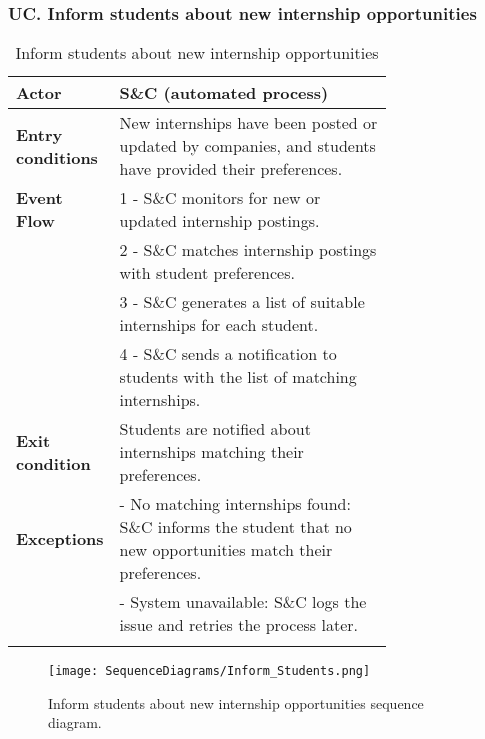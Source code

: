 \subsubsection*{UC\cuc . Inform students about new internship opportunities}
\begin{center}
    \begin{longtable}{|l|p{0.75\linewidth}|}
        \hline
        \textbf{Actor}            & S\&C (automated process) \\
        \hline
        \textbf{Entry conditions} & New internships have been posted or updated by companies, and students have provided their preferences. \\
        \hline
        \textbf{Event Flow}       & 1 - S\&C monitors for new or updated internship postings. \\
        & 2 - S\&C matches internship postings with student preferences. \\
        & 3 - S\&C generates a list of suitable internships for each student. \\
        & 4 - S\&C sends a notification to students with the list of matching internships. \\
        \hline
        \textbf{Exit condition}   & Students are notified about internships matching their preferences. \\       
        \hline
        \textbf{Exceptions}       & - No matching internships found: S\&C informs the student that no new opportunities match their preferences. \\
                                  & - System unavailable: S\&C logs the issue and retries the process later. \\
        \hline
        \caption{Inform students about new internship opportunities}
        \label{tab:inform_students_usecase}
    \end{longtable}
\end{center}

\begin{figure}[H]
    \begin{center}
        \texttt{[image: SequenceDiagrams/Inform\_Students.png]}
        \caption{Inform students about new internship opportunities sequence diagram.}
        \label{fig:inform_students_seqd}%
    \end{center}
\end{figure}


\newpage

